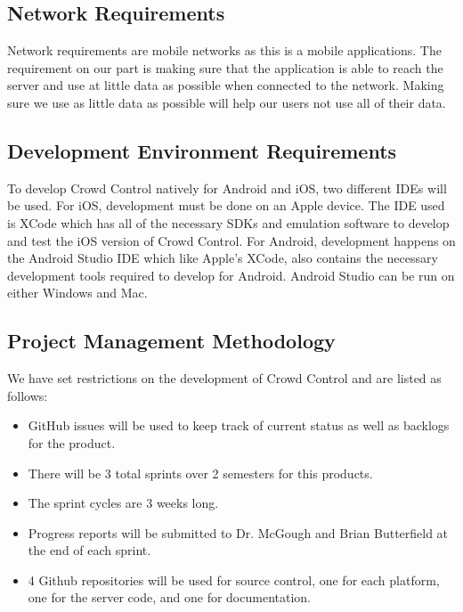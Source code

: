 \subsection{Network Requirements}

Network requirements are mobile networks as this is a mobile applications. The requirement on our part is making sure that the application is able to reach the server and use at little data as possible when connected to the network. Making sure we use as little data as possible will help our users not use all of their data. 

\subsection{Development Environment Requirements}
To develop Crowd Control natively for Android and iOS, two different IDEs will be used.  For iOS, development must be done on an Apple device.  The IDE used is XCode which has all of the necessary SDKs and emulation software to develop and test the iOS version of Crowd Control.  For Android, development happens on the Android Studio IDE which like Apple's XCode, also contains the necessary development tools required to develop for Android.  Android Studio can be run on either  Windows and Mac. 

\subsection{Project  Management Methodology}

We have set restrictions on the development of Crowd Control and are listed as follows:
 
\begin{itemize}
\item GitHub issues will be used to keep track of current status as well as backlogs for the product.
\item There will be 3 total sprints over 2 semesters for this products.
\item The sprint cycles are 3 weeks long.
\item Progress reports will be submitted to Dr. McGough and Brian Butterfield at the end of each sprint.
\item 4 Github repositories will be used for source control, one for each platform, one for the server code, and one for documentation. 
\end{itemize}


